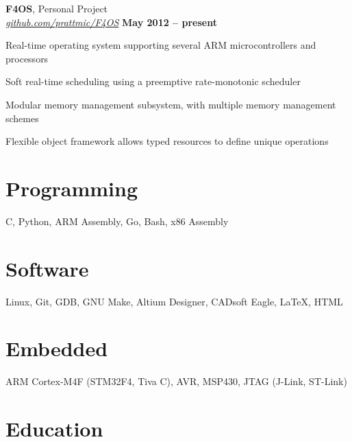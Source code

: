 \documentclass[margin,line,letterpaper]{resume}
\begin{document}
\begin{resume}
    \textbf{F4OS}, Personal Project\vspace{1mm}\\\vspace{1mm}%
    \textsl{\href{http://github.com/prattmic/F4OS}{github.com/prattmic/F4OS}}  \hfill \textbf{May 2012 -- present} \vspace{-3mm}\\\vspace{-1mm}%
    \begin{list2}
    \item Real-time operating system supporting several ARM microcontrollers and processors
    \item Soft real-time scheduling using a preemptive rate-monotonic scheduler
    \item Modular memory management subsystem, with multiple memory management schemes
    \item Flexible object framework allows typed resources to define unique operations
    \end{list2}


    \vspace{2.5mm}
    \section{\mysidestyle Programming}
    C, Python, ARM Assembly, Go, Bash, x86 Assembly
    \vspace{-5mm}

    \section{\mysidestyle Software}
    Linux, Git, GDB, GNU Make, Altium Designer, CADsoft Eagle, \LaTeX, HTML
    \vspace{-5mm}

    \section{\mysidestyle Embedded}
    ARM Cortex-M4F (STM32F4, Tiva C), AVR, MSP430, JTAG (J-Link, ST-Link)

    \section{\mysidestyle Education}


\end{resume}
\end{document}

